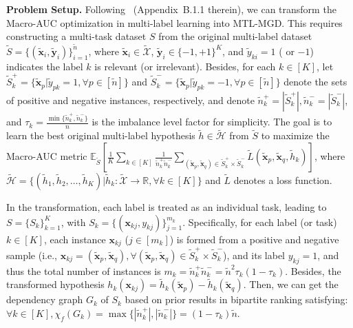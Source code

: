 \documentclass{article}
\def\sR{\mathbb{R}}
\def\vx{{\mathbf{x}}}
\def\vy{{\mathbf{y}}}
\def\eE{\mathbb{E}}
\begin{document}
\textbf{Problem Setup.} Following~\cite{wu2023macro-auc} (Appendix~B.1.1 therein), we can transform the Macro-AUC optimization in multi-label learning into MTL-MGD.
This requires constructing a multi-task dataset \(S\) from the original multi-label dataset \(\widetilde{S} = \{ (\widetilde{\vx}_i, \widetilde{\vy}_i) \}_{i=1}^{\tilde{n}}\), where \( \widetilde{\vx}_i \in \widetilde{\mathcal{X}}\), \(\widetilde{\vy}_i \in \{ -1, +1 \}^K\), and \( \widetilde{y}_{ki} = 1 \) ( or \(-1\)) indicates the label \( k\) is relevant (or irrelevant). 
Besides, for each \(k \in [K]\), let \(\widetilde{S}_k^+ = \{ \widetilde{\vx}_p | \widetilde{y}_{pk} = 1, \forall p \in [\tilde{n}]\}\) and \(\widetilde{S}_k^- = \{ \widetilde{\vx}_p | \widetilde{y}_{pk} = -1, \forall p \in [\tilde{n}]\}\) denote the sets of positive and negative instances, respectively, and denote \(\tilde{n}_k^+ = | \widetilde{S}_k^+ |, \tilde{n}_k^- = | \widetilde{S}_k^- | \), and \(\tau_k = \frac{\min \{ \tilde{n}_k^+, \tilde{n}_k^- \}}{n}\) is the imbalance level factor for simplicity. The goal is to learn the best original multi-label hypothesis \( \tilde{h} \in \widetilde{\mathcal{H}} \) from \(\widetilde{S}\) to maximize the Macro-AUC metric \( \eE_{\widetilde{S}} \left[ \frac{1}{K} \sum_{k \in [K]} \frac{1}{\tilde{n}_k^+ \tilde{n}_k^-} \sum_{ (\widetilde{\vx}_p, \widetilde{\vx}_q) \in \widetilde{S}_k^+ \times \widetilde{S}_k^-} \tilde{L} (\widetilde{\vx}_p, \widetilde{\vx}_q, \tilde{h}_k ) \right] \), where \( \widetilde{\mathcal{H}} = \{(\tilde{h}_1,\tilde{h}_2,\dots, \tilde{h}_K) | \tilde{h}_k: \widetilde{\mathcal{X}} \rightarrow \sR, \forall k \in [K]\} \) and $\tilde{L}$ denotes a loss function.

In the transformation, each label is treated as an individual task, leading to \(S = \{ S_k \}_{k=1}^K\), with \(S_k = \{ (\vx_{kj}, y_{kj}) \}_{j=1}^{m_k}\). 
Specifically, for each label (or task) $k \in [K]$, each instance \(\vx_{kj}\) (\(j \in [m_k]\)) is formed from a positive and negative sample (i.e., \( \vx_{kj} = (\widetilde{\vx}_p, \widetilde{\vx}_q), \forall (\widetilde{\vx}_p, \widetilde{\vx}_q) \in \widetilde{S}_k^+ \times \widetilde{S}_k^- \)), and its label \(y_{kj} = 1\), and thus the total number of instances is \(m_k = \tilde{n}_k^+ \tilde{n}_k^- = \tilde{n}^2 \tau_k (1 - \tau_k)\). 
Besides, the transformed hypothesis \( h_k(\vx_{kj}) = \tilde{h}_k(\widetilde{\vx}_p) - \tilde{h}_k(\widetilde{\vx}_q)\). Then, we can get the dependency graph \(G_k\) of \(S_k\) based on prior results in bipartite ranking \cite{ralaivola2015entropy} satisfying: $\forall k \in [K], \chi _f(G_k) = \max \{|\tilde{n}_k^+|,|\tilde{n}_k^-|\} = (1- \tau _k) \tilde{n}.$
\end{document}

